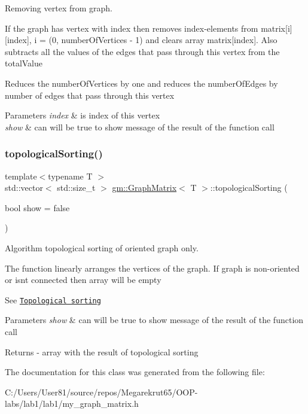 Removing vertex from graph. 

If the graph has vertex with \textquotesingle{}index\textquotesingle{} then removes index-\/elements from \textquotesingle{}matrix\mbox{[}i\mbox{]}\mbox{[}index\mbox{]}\textquotesingle{}, i = (0, \textquotesingle{}number\+Of\+Vertices\textquotesingle{} -\/ 1) and clears array \textquotesingle{}matrix\mbox{[}index\mbox{]}\textquotesingle{}. Also subtracts all the values of the edges that pass through this vertex from the \textquotesingle{}total\+Value\textquotesingle{}

Reduces the \textquotesingle{}number\+Of\+Vertices\textquotesingle{} by one and reduces the \textquotesingle{}number\+Of\+Edges\textquotesingle{} by number of edges that pass through this vertex 
\begin{DoxyParams}{Parameters}
{\em index} & is index of this vertex \\
\hline
{\em show} & can will be true to show message of the result of the function call \\
\hline
\end{DoxyParams}
\mbox{\label{classgm_1_1_graph_matrix_a8f88b6ebce9cc1ed403d414cd173da02}} 
\subsubsection{\texorpdfstring{topological\+Sorting()}{topologicalSorting()}}
{\footnotesize\ttfamily template$<$typename T $>$ \\
std\+::vector$<$ std\+::size\+\_\+t $>$ \mbox{\hyperlink{classgm_1_1_graph_matrix}{gm\+::\+Graph\+Matrix}}$<$ T $>$\+::topological\+Sorting (\begin{DoxyParamCaption}\item[{bool}]{show = {\ttfamily false} }\end{DoxyParamCaption})}



Algorithm topological sorting of oriented graph only. 

The function linearly arranges the vertices of the graph. If graph is non-\/oriented or isn\textquotesingle{}t connected then array will be empty

See \href{https://en.wikipedia.org/wiki/Topological_sorting}{\tt Topological sorting} 
\begin{DoxyParams}{Parameters}
{\em show} & can will be true to show message of the result of the function call \\
\hline
\end{DoxyParams}
\begin{DoxyReturn}{Returns}
-\/ array with the result of topological sorting 
\end{DoxyReturn}


The documentation for this class was generated from the following file\+:\begin{DoxyCompactItemize}
\item 
C\+:/\+Users/\+User81/source/repos/\+Megarekrut65/\+O\+O\+P-\/labs/lab1/lab1/my\+\_\+graph\+\_\+matrix.\+h\end{DoxyCompactItemize}
